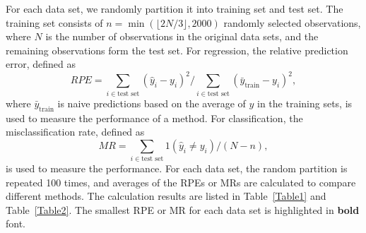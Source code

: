 \documentclass[nojss]{jss}
\numberwithin{equation}{section}
\begin{document}
%
For each data set, we randomly partition it into training set and test set. The training set consists of $n=\min(\lfloor 2N/3\rfloor,2000)$ randomly selected observations, where $N$ is the number of observations in the original data sets, and the remaining observations form the test set. For regression, the relative prediction error, defined as
$$RPE=\sum_{i\in \text{test set}}(\hat{y}_i-y_i)^2/\sum_{i\in \text{test set}}(\bar{y}_{\text{train}}-y_i)^2,$$
where $\bar{y}_{\text{train}}$ is naive predictions based on the average of $y$ in the training sets, is used to measure the performance of a method. For classification, the misclassification rate, defined as
$$MR=\sum_{i\in \text{test set}} 1(\hat{y}_i \neq y_i) /(N-n),$$
is used to measure the performance. For each data set, the random partition is repeated 100 times,  and averages of the RPEs or MRs are calculated to compare different methods. The calculation results are listed in Table~\ref{Table1} and Table~\ref{Table2}. The smallest RPE or MR for each data set is highlighted in \textbf{bold} font.
\end{document}

